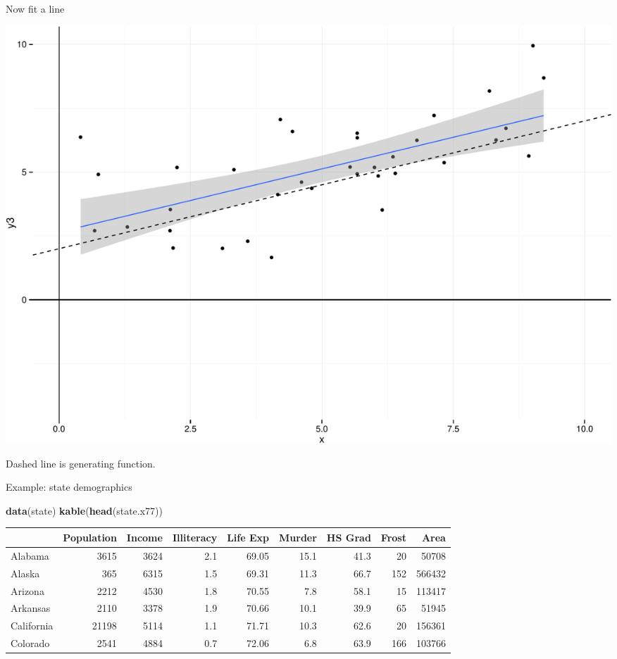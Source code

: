\documentclass[ignorenonframetext,]{beamer}
\newenvironment{Shaded}{\begin{snugshade}}{\end{snugshade}}
\newcommand{\KeywordTok}[1]{\textcolor[rgb]{0.13,0.29,0.53}{\textbf{{#1}}}}
\newcommand{\NormalTok}[1]{{#1}}
\begin{document}
\begin{frame}{Now fit a line}

\includegraphics{Regression_files/figure-beamer/unnamed-chunk-8-1.pdf}

Dashed line is generating function.

\end{frame}


\begin{frame}[fragile]{Example: state demographics}

\begin{Shaded}
\begin{Highlighting}[]
\KeywordTok{data}\NormalTok{(state)}
\KeywordTok{kable}\NormalTok{(}\KeywordTok{head}\NormalTok{(state.x77))}
\end{Highlighting}
\end{Shaded}

\begin{longtable}[c]{@{}lrrrrrrrr@{}}
\toprule
& Population & Income & Illiteracy & Life Exp & Murder & HS Grad & Frost
& Area\tabularnewline
\midrule
\endhead
Alabama & 3615 & 3624 & 2.1 & 69.05 & 15.1 & 41.3 & 20 &
50708\tabularnewline
Alaska & 365 & 6315 & 1.5 & 69.31 & 11.3 & 66.7 & 152 &
566432\tabularnewline
Arizona & 2212 & 4530 & 1.8 & 70.55 & 7.8 & 58.1 & 15 &
113417\tabularnewline
Arkansas & 2110 & 3378 & 1.9 & 70.66 & 10.1 & 39.9 & 65 &
51945\tabularnewline
California & 21198 & 5114 & 1.1 & 71.71 & 10.3 & 62.6 & 20 &
156361\tabularnewline
Colorado & 2541 & 4884 & 0.7 & 72.06 & 6.8 & 63.9 & 166 &
103766\tabularnewline
\bottomrule
\end{longtable}

\end{frame}
\end{document}
